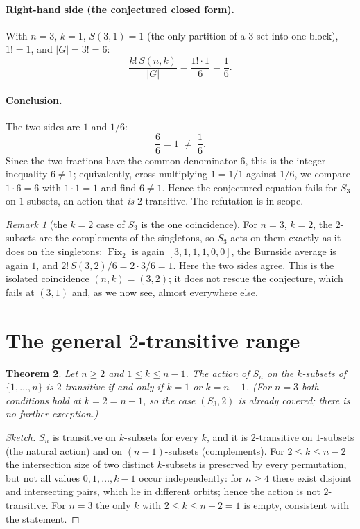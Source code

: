 \documentclass[11pt]{article}
\newtheorem{theorem}{Theorem}
\theoremstyle{definition}
\theoremstyle{remark}
\newtheorem{remark}[theorem]{Remark}
\newcommand{\Sn}{S_n}
\newcommand{\Sthree}{S_3}
\newcommand{\Fix}{\operatorname{Fix}}
\newcommand{\Stir}[2]{S(#1,#2)}
\begin{document}
\paragraph{Right-hand side (the conjectured closed form).}
With $n=3$, $k=1$, $\Stir{3}{1}=1$ (the only partition of a $3$-set into one
block), $1! = 1$, and $|G| = 3! = 6$:
\[
\frac{k!\,\Stir{n}{k}}{|G|} = \frac{1!\cdot 1}{6} = \frac{1}{6}.
\]

\paragraph{Conclusion.} The two sides are $1$ and $1/6$:
\[
\frac{6}{6} = 1 \;\neq\; \frac{1}{6}.
\]
Since the two fractions have the common denominator $6$, this is the integer
inequality $6 \neq 1$; equivalently, cross-multiplying $1 = 1/1$ against
$1/6$, we compare $1\cdot 6 = 6$ with $1 \cdot 1 = 1$ and find $6 \neq 1$.
Hence the conjectured equation fails for $\Sthree$ on $1$-subsets, an action
that \emph{is} $2$-transitive. The refutation is in scope.

\begin{remark}[the $k=2$ case of $\Sthree$ is the one coincidence]
For $n=3$, $k=2$, the $2$-subsets are the complements of the singletons, so
$\Sthree$ acts on them exactly as it does on the singletons: $\Fix_2$ is again
$[3,1,1,1,0,0]$, the Burnside average is again $1$, and
$2!\,\Stir{3}{2}/6 = 2\cdot 3/6 = 1$. Here the two sides agree. This is the
isolated coincidence $(n,k)=(3,2)$; it does not rescue the conjecture, which
fails at $(3,1)$ and, as we now see, almost everywhere else.
\end{remark}

\section{The general $2$-transitive range}
\label{sec:general}

\begin{theorem}\label{thm:range}
Let $n \ge 2$ and $1 \le k \le n-1$. The action of $\Sn$ on the $k$-subsets of
$\{1,\dots,n\}$ is $2$-transitive if and only if $k=1$ or $k=n-1$.
(For $n=3$ both conditions hold at $k=2=n-1$, so the case $(\Sthree,2)$ is
already covered; there is no further exception.)
\end{theorem}

\begin{proof}[Sketch]
$\Sn$ is transitive on $k$-subsets for every $k$, and it is $2$-transitive on
$1$-subsets (the natural action) and on $(n-1)$-subsets (complements). For
$2 \le k \le n-2$ the intersection size of two distinct $k$-subsets is
preserved by every permutation, but not all values $0,1,\dots,k-1$ occur
independently: for $n \ge 4$ there exist disjoint and intersecting pairs, which
lie in different orbits; hence the action is not $2$-transitive. For $n=3$ the
only $k$ with $2 \le k \le n-2=1$ is empty, consistent with the statement.
\end{proof}
\end{document}
